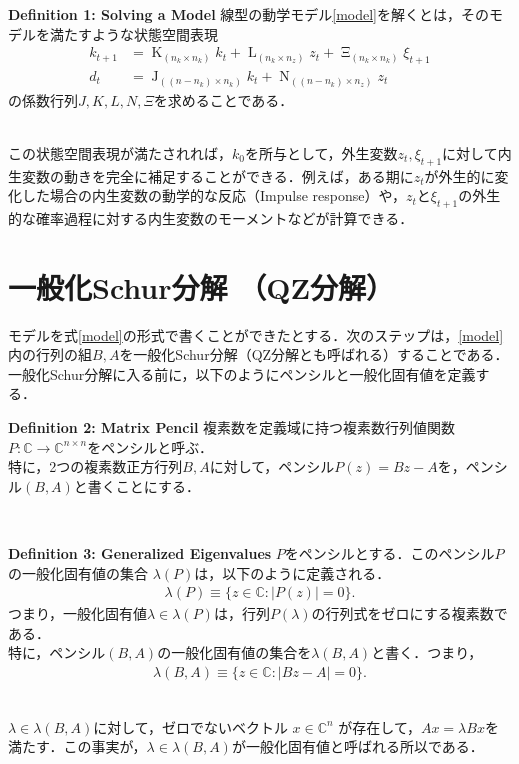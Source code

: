 \documentclass[a4j, dvipdfmx]{jarticle}
\begin{document}
\begin{itembox}[l]{{\bf Definition 1: Solving a Model}}
線型の動学モデル\eqref{model}を解くとは，そのモデルを満たすような状態空間表現
\begin{align*}
k_{t+1} &= \mathop{K}_{(n_k \times n_k)} k_t + \mathop{L}_{(n_k \times n_z)} z_t + \mathop{\Xi}_{(n_k \times n_k)} \xi_{t+1}\\
d_t &= \mathop{J}_{((n-n_k)\times n_k)} k_t + \mathop{N}_{((n-n_k) \times n_z)} z_t
\end{align*}
の係数行列$J, K, L , N , \Xi$を求めることである．
\end{itembox}\\

この状態空間表現が満たされれば，$k_0$を所与として，外生変数$z_t, \xi_{t+1}$に対して内生変数の動きを完全に補足することができる．例えば，ある期に$z_t$が外生的に変化した場合の内生変数の動学的な反応（Impulse response）や，$z_tと\xi_{t+1}$の外生的な確率過程に対する内生変数のモーメントなどが計算できる．

\section{一般化Schur分解 （QZ分解）}
モデルを式\eqref{model}の形式で書くことができたとする．次のステップは，\eqref{model}内の行列の組$B, A$を一般化Schur分解（QZ分解とも呼ばれる）することである．一般化Schur分解に入る前に，以下のようにペンシルと一般化固有値を定義する．\\

\begin{itembox}[l]{{\bf Definition 2: Matrix Pencil}}
複素数を定義域に持つ複素数行列値関数$P: \mathbb{C}\to \mathbb{C}^{n\times n}$をペンシルと呼ぶ．\\
特に，2つの複素数正方行列$B, A$に対して，ペンシル$P(z) = Bz - A$を，ペンシル$(B,A)$と書くことにする．
\end{itembox}
\\

\begin{itembox}[l]{{\bf Definition 3: Generalized Eigenvalues}}
$P$をペンシルとする．このペンシル$P$の一般化固有値の集合 $\lambda(P)$は，以下のように定義される．
\begin{align*}
\lambda(P) \equiv \{z\in \mathbb{C}: |P(z)| = 0\}.
\end{align*}
つまり，一般化固有値$\lambda \in \lambda(P)$は，行列$P(\lambda)$の行列式をゼロにする複素数である．\\
特に，ペンシル$(B,A)$の一般化固有値の集合を$\lambda(B,A)$と書く．つまり，
\begin{align*}
\lambda(B,A) \equiv \{z\in\mathbb{C}: |Bz-A|=0\}.
\end{align*}
\end{itembox}
\\
$\lambda \in \lambda(B,A)$に対して，ゼロでないベクトル $x \in \mathbb{C}^n$ が存在して，$Ax = \lambda Bx$を満たす．この事実が，$\lambda\in\lambda(B,A)$が一般化固有値と呼ばれる所以である．\\
\end{document}
